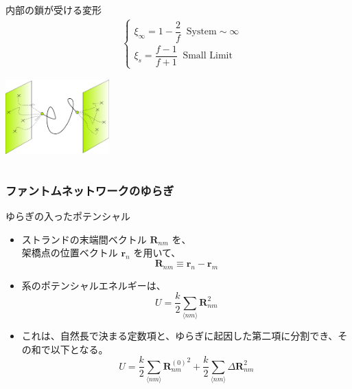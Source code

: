 \documentclass[aspectratio=169,11pt, dvipdfmx]{beamer}
\begin{document}
\begin{frame}
\begin{columns}[totalwidth=1\textwidth]
\begin{exampleblock}{内部の鎖が受ける変形}
\begin{align*}
							&\begin{cases}
							\xi_{\infty} = 1-\dfrac{2}{f} \;\; \text{System}\sim \infty \\[8pt]
							\xi_{s} = \dfrac{f-1}{f+1} \;\; \text{Small Limit}
							\end{cases}
					\end{align*}
					\vspace{-3mm}
					\begin{center}
						\includegraphics[width=0.3\textwidth]{phantom.png}
					\end{center}
				\end{exampleblock}
		\end{columns}
\end{frame}
\begin{frame}
	\frametitle{ファントムネットワークのゆらぎ}
		\begin{block}{ゆらぎの入ったポテンシャル}
			\begin{itemize}
				\item ストランドの末端間ベクトル $\bm{R}_{nm}$ を、\\架橋点の位置ベクトル $\bm{r}_n$ を用いて、
					\footnotesize
					\begin{equation*}
						\bm{R}_{nm} \equiv \bm{r}_n-\bm{r}_m
					\end{equation*}
					\normalsize
				\item 系のポテンシャルエネルギーは、
					\footnotesize
					\begin{equation*}
						U=\dfrac{k}{2} \sum_{\langle nm \rangle} \bm{R}_{nm}^2
					\end{equation*}
					\normalsize
				\item これは、自然長で決まる定数項と、ゆらぎに起因した第二項に分割でき、その和で以下となる。
					\footnotesize
					\begin{equation*}
						U=\dfrac{k}{2} \sum_{\langle nm \rangle} {\bm{R}_{nm}^{(0)}}^2 + \dfrac{k}{2} \sum_{\langle nm \rangle} \Delta \bm{R}_{nm}^2
					\end{equation*}
					\normalsize
			\end{itemize}
		\end{block}
\end{frame}
\end{document}
